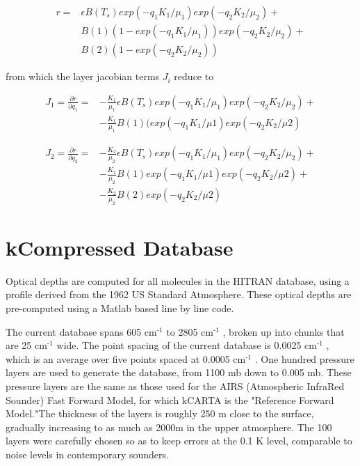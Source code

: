 \documentclass[11pt]{article}
\begin{document}
$$\begin{aligned}
r = & \epsilon B(T_{s}) exp(-q_{1} K_{1}/\mu_{1})exp(-q_{2} K_{2}/\mu_{2}) +\\
    & B(1)(1-exp(-q_{1} K_{1}/\mu_{1}))exp(-q_{2} K_{2}/\mu_{2}) + \\
    & B(2)(1-exp(-q_{2} K_{2}/\mu_{2}))\end{aligned}$$

from which the layer jacobian terms $J_{i}$ reduce to

$$\begin{aligned}
J_{1} = \frac{\partial r}{\partial q_1} = & 
 -\frac{K_1}{\mu_1}\epsilon B(T_{s})exp(-q_1 K_1/\mu_1)exp(-q_2 K_2/\mu_2) + \\
&-\frac{K_1}{\mu_1} B(1)(exp(-q_{1} K_{1}/\mu{1})exp(-q_{2} K_{2}/\mu{2})\end{aligned}$$

$$\begin{aligned}
J_{2} = \frac{\partial r}{\partial q_2} = & 
-\frac{K_2}{\mu_2}\epsilon B(T_{s})exp(-q_1 K_1/\mu_1)exp(-q_2 K_2/\mu_2) + \\
& -\frac{K_2}{\mu_2} B(1)exp(-q_{1} K_{1}/\mu{1})exp(-q_{2} K_{2}/\mu{2}) + \\
& -\frac{K_2}{\mu_2} B(2)exp(-q_{2} K_{2}/\mu{2})\end{aligned}$$

\section{kCompressed Database}
\label{sec-4}

Optical depths are computed for all molecules in the HITRAN database,
using a profile derived from the 1962 US Standard Atmosphere. These
optical depths are pre-computed using a Matlab based line by line code.

The current database spans 605 cm$^{\text{-1}}$ to 2805 cm$^{\text{-1}}$ , broken up into chunks
that are 25 cm$^{\text{-1}}$ wide. The point spacing of the current database is
0.0025 cm$^{\text{-1}}$ , which is an average over five points spaced at 0.0005 cm$^{\text{-1}}$
. One hundred pressure layers are used to generate the database, from
1100 mb down to 0.005 mb. These pressure layers are the same as those
used for the AIRS (Atmospheric InfraRed Sounder) Fast Forward Model, for
which kCARTA is the "Reference Forward Model."The thickness of the
layers is roughly 250 m close to the surface, gradually increasing to as
much as 2000m in the upper atmosphere. The 100 layers were carefully
chosen so as to keep errors at the 0.1 K level, comparable to noise
levels in contemporary sounders.
\end{document}
